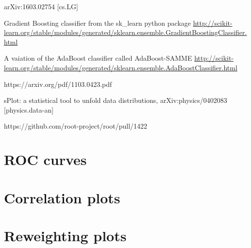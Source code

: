 \documentclass[english]{uzhpub}
\begin{document}
\begin{thebibliography}{100}
     arXiv:1603.02754 [cs.LG]

    Gradient Boosting classifier from the sk\_learn python package \url{http://scikit-learn.org/stable/modules/generated/sklearn.ensemble.GradientBoostingClassifier.html}

    A vaiation of the AdaBoost classifier called AdaBoost-SAMME \url{http://scikit-learn.org/stable/modules/generated/sklearn.ensemble.AdaBoostClassifier.html}

    https://arxiv.org/pdf/1103.0423.pdf


    sPlot: a statistical tool to unfold data distributions,
   	arXiv:physics/0402083 [physics.data-an]

     https://github.com/root-project/root/pull/1422



 \end{thebibliography}

 \begin{appendix}
   \section{ROC curves}
   \label{app:roc}
   

   \section{Correlation plots}
   \label{app:corr}
   

   \section{Reweighting plots}
   \label{app:re}
   

 \end{appendix}

 
\end{document}
